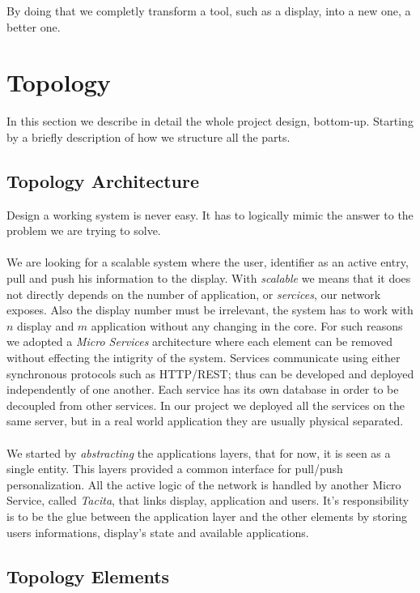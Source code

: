 \documentclass[]{usiinfbachelorproject}
\begin{document}
By doing that we completly transform a tool, such as a display, into a new one, a better one.
\section{Topology}
In this section we describe in detail the whole project design, bottom-up. Starting by a briefly description of how we structure all the parts.
\subsection{Topology Architecture}
Design a working system is never easy. It has to logically mimic the answer to the problem we are trying to solve.
\\
\\
We are looking for a scalable system where the user, identifier as an active entry, pull and push his information to the display. With \emph{scalable} we means that it does not directly depends on the number of application, or \emph{sercices}, our network exposes. Also the display number must be irrelevant, the system has to work with $n$ display and $m$ application without any changing in the core.
For such reasons we adopted a \emph{Micro Services} architecture where each element can be removed without effecting the intigrity of the system. Services communicate using either synchronous protocols such as HTTP/REST; thus can be developed and deployed independently of one another. Each service has its own database in order to be decoupled from other services. In our project we deployed all the services on the same server, but in a real world application they are usually physical separated.
\\
\\
 We started by \emph{abstracting} the applications layers, that for now, it is seen as a single entity. This layers provided a common interface for pull/push personalization.
 All the active logic of the network is handled by another Micro Service, called \emph{Tacita}, that links display, application and users. It's responsibility is to be the glue between the application layer and the other elements by storing users informations, display's state and available applications.

\subsection{Topology Elements}
\end{document}

